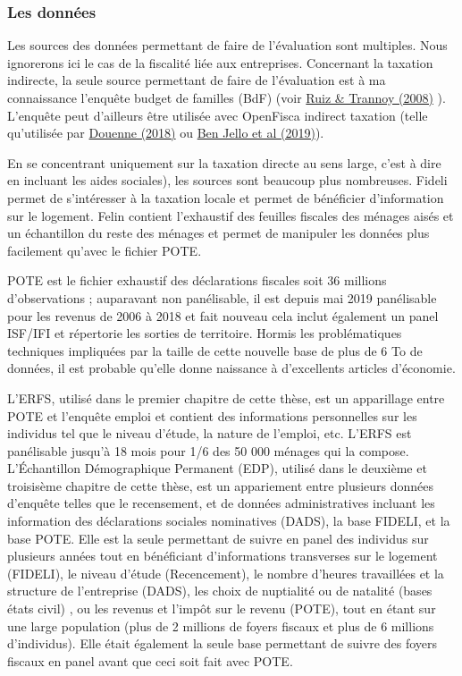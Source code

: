 \subsubsection{Les données}\label{les-donnuxe9es}

Les sources des données permettant de faire de l'évaluation sont
multiples. Nous ignorerons ici le cas de la fiscalité liée aux
entreprises. Concernant la taxation indirecte, la seule source
permettant de faire de l'évaluation est à ma connaissance l'enquête
budget de familles (BdF) (voir
\href{https://www.persee.fr/doc/estat_0336-1454_2008_num_413_1_7034}{Ruiz
\& Trannoy (2008)} ). L'enquête peut d'ailleurs être utilisée avec
OpenFisca indirect taxation (telle qu'utilisée par
\href{https://www.parisschoolofeconomics.eu/docs/douenne-thomas/douenne_faere_wp2018.10.pdf}{Douenne
(2018)} ou
\href{https://www.ipp.eu/wp-content/uploads/2019/01/n37-notesIPP-janvier2019.pdf}{Ben
Jello et al (2019)}).

En se concentrant uniquement sur la taxation directe au sens large,
c'est à dire en incluant les aides sociales), les sources sont beaucoup
plus nombreuses. Fideli permet de s'intéresser à la taxation locale et
permet de bénéficier d'information sur le logement. Felin contient
l'exhaustif des feuilles fiscales des ménages aisés et un échantillon du
reste des ménages et permet de manipuler les données plus facilement
qu'avec le fichier POTE.

POTE est le fichier exhaustif des déclarations fiscales soit 36 millions
d'observations ; auparavant non panélisable, il est depuis mai 2019
panélisable pour les revenus de 2006 à 2018 et fait nouveau cela inclut
également un panel ISF/IFI et répertorie les sorties de territoire.
Hormis les problématiques techniques impliquées par la taille de cette
nouvelle base de plus de 6 To de données, il est probable qu'elle donne
naissance à d'excellents articles d'économie.

L'ERFS, utilisé dans le premier chapitre de cette thèse, est un
apparillage entre POTE et l'enquête emploi et contient des informations
personnelles sur les individus tel que le niveau d'étude, la nature de
l'emploi, etc. L'ERFS est panélisable jusqu'à 18 mois pour 1/6 des 50
000 ménages qui la compose. L'Échantillon Démographique Permanent (EDP),
utilisé dans le deuxième et troisisème chapitre de cette thèse, est un
appariement entre plusieurs données d'enquête telles que le recensement,
et de données administratives incluant les information des déclarations
sociales nominatives (DADS), la base FIDELI, et la base POTE. Elle est
la seule permettant de suivre en panel des individus sur plusieurs
années tout en bénéficiant d'informations transverses sur le logement
(FIDELI), le niveau d'étude (Recencement), le nombre d'heures
travaillées et la structure de l'entreprise (DADS), les choix de
nuptialité ou de natalité (bases états civil) , ou les revenus et
l'impôt sur le revenu (POTE), tout en étant sur une large population
(plus de 2 millions de foyers fiscaux et plus de 6 millions
d'individus). Elle était également la seule base permettant de suivre
des foyers fiscaux en panel avant que ceci soit fait avec POTE.

